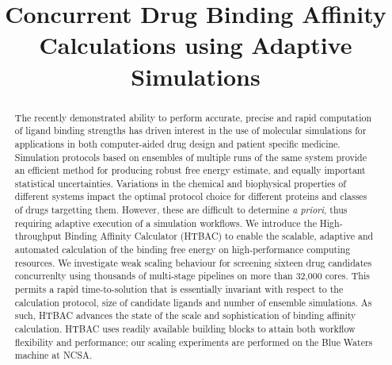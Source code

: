 \documentclass{llncs}
\title{Concurrent Drug Binding Affinity Calculations using Adaptive Simulations}
\begin{document}
\maketitle





\begin{abstract}

The recently demonstrated ability to perform accurate, precise and rapid
computation of ligand binding strengths has driven interest in the use of
molecular simulations for applications in both computer-aided drug design and
patient specific medicine. Simulation protocols based on ensembles of multiple
runs of the same system provide an efficient method for producing robust free
energy estimate, and equally important statistical uncertainties. Variations
in the chemical and biophysical properties of different systems impact the
optimal protocol choice for different proteins and classes of drugs targetting
them. However, these are difficult to determine {\it a priori}, thus requiring
adaptive execution of a simulation workflows. We introduce the High-throughput
Binding Affinity Calculator (HTBAC) to enable the scalable, adaptive and
automated calculation of the binding free energy on high-performance computing
resources. We investigate weak scaling behaviour for screening sixteen drug
candidates concurrenlty using thousands of multi-stage pipelines on more than
32,000 cores. This permits a rapid time-to-solution that is essentially
invariant with respect to the calculation protocol, size of candidate ligands
and number of ensemble simulations. As such, HTBAC advances the state of the
scale and sophistication of binding affinity calculation. HTBAC uses readily
available building blocks to attain both workflow flexibility and performance;
our scaling experiments are performed on the Blue Waters machine at NCSA.

\end{abstract}


\end{document}
